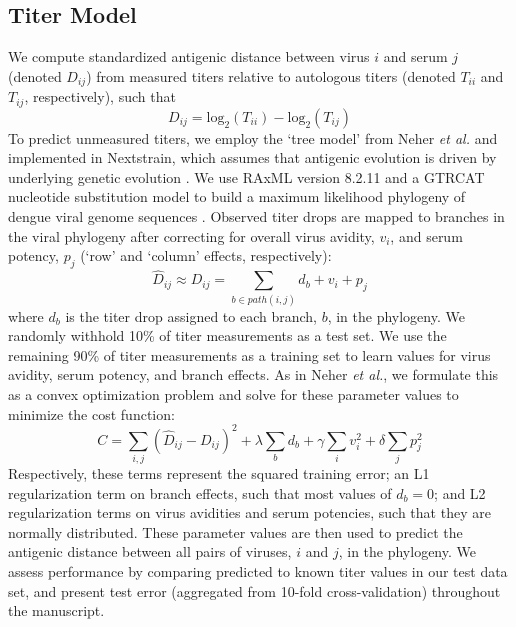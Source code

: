 \documentclass[11pt,oneside,letterpaper]{article}
\begin{document}
\subsection*{Titer Model}
We compute standardized antigenic distance between virus $i$ and serum $j$ (denoted $D_{ij}$) from measured titers relative to autologous titers (denoted $T_{ii}$ and $T_{ij}$, respectively), such that
\begin{equation}
  \label{eq_titer_norm}
D_{ij} = \mathrm{log}_2(T_{ii}) - \mathrm{log}_2(T_{ij})
\end{equation}
To predict unmeasured titers, we employ the `tree model' from Neher \textit{et al.} and implemented in Nextstrain, which assumes that antigenic evolution is driven by underlying genetic evolution \citep{hadfield2017nextstrain,neher2016prediction}.
We use RAxML version 8.2.11 and a GTRCAT nucleotide substitution model to build a maximum likelihood phylogeny of dengue viral genome sequences \citep{stamatakis2014raxml}.
Observed titer drops are mapped to branches in the viral phylogeny after correcting for overall virus avidity, $v_i$, and serum potency, $p_j$ (`row' and `column' effects, respectively):
\begin{equation}
  \label{eq_predicted_titers}
\hat{D}_{ij} \approx D_{ij} = \sum_{b \in path(i,j)} d_b + v_i + p_j
\end{equation}
where $d_b$ is the titer drop assigned to each branch, $b$, in the phylogeny.
We randomly withhold 10\% of titer measurements as a test set.
We use the remaining 90\% of titer measurements as a training set to learn values for virus avidity, serum potency, and branch effects.
As in Neher \textit{et al.}, we formulate this as a convex optimization problem and solve for these parameter values to minimize the cost function:
\begin{equation}
  \label{eq_cost_fn}
C = \sum_{i,j} (\hat{D}_{ij} - D_{ij})^2 + \lambda \sum_{b} d_b + \gamma \sum_{i} v_i^2 + \delta \sum_{j} p_j^2
\end{equation}
Respectively, these terms represent the squared training error; an L1 regularization term on branch effects, such that most values of $d_b = 0$; and L2 regularization terms on virus avidities and serum potencies, such that they are normally distributed.
These parameter values are then used to predict the antigenic distance between all pairs of viruses, $i$ and $j$, in the phylogeny.
We assess performance by comparing predicted to known titer values in our test data set, and present test error (aggregated from 10-fold cross-validation) throughout the manuscript.
\end{document}
